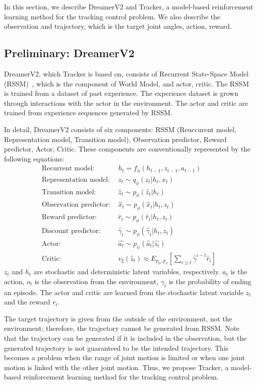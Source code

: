 \documentclass[letterpaper, 10 pt, conference]{ieeeconf}  %
\begin{document}
In this section, we describe DreamerV2 and Tracker, a model-based reinforcement learning method for the tracking control problem. We also describe the observation and trajectory, which is the target joint angles, action, reward.

\subsection{Preliminary: DreamerV2}
DreamerV2, which Tracker is based on, consists of Recurrent State-Space Model (RSSM)~\cite{hafner2019learning}, which is the component of World Model, and actor, critic. The RSSM is trained from a dataset of past experience. The experience dataset is grown through interactions with the actor in the environment. The actor and critic are trained from experience sequences generated by RSSM.

In detail, DreamerV2 consists of six components: RSSM (Reuccurent model, Representation model, Transition model), Observation predictor, Reward predictor, Actor, Critic. These components are conventionally represented by the following equations:
\begin{align}
\text{Recurrent model: } & h_t = f_{\phi}(h_{t-1}, z_{t-1}, a_{t-1})\\
\text{Representation model: } & z_t \sim q_{\phi}(z_t | h_t, x_t)\\
\text{Transition model: } & \hat{z}_t \sim p_{\phi}(\hat{z}_t | h_t)\\
\text{Observation predictor: } & \hat{x}_t \sim p_{\phi}(\hat{x}_t | h_t, z_t)\\
\text{Reward predictor: } & \hat{r}_t \sim p_{\phi}(\hat{r}_t | h_t, z_t)\\
\text{Discount predictor: } & \hat{\gamma}_t \sim p_{\phi}(\hat{\gamma}_t | h_t, z_t) \\
\text{Actor: } & \hat{a_t} \sim p_{\psi}(\hat{a}_t | \hat{z_t})\\
\text{Critic: } & v_{\xi}(\hat{z}_t) \approx E_{p_{\phi}, p_{\psi}}\left[\sum_{i\geq t}\hat{\gamma}^{i-t}\hat{r}_i\right]
\end{align}
$z_t$ and $h_t$ are stochastic and deterministic latent variables, respectively. $a_t$ is the action, $o_t$ is the observation from the environment, $\gamma_t$ is the probability of ending an episode. The actor and critic are learned from the stochastic latent variable $z_t$ and the reward $r_t$. 

The target trajectory is given from the outside of the environment, not the environment; therefore, the trajectory cannot be generated from RSSM. Note that the trajectory can be generated if it is included in the observation, but the generated trajectory is not guaranteed to be the intended trajectory. This becomes a problem when the range of joint motion is limited or when one joint motion is linked with the other joint motion. Thus, we propose Tracker, a model-based reinforcement learning method for the tracking control problem. 
\end{document}
